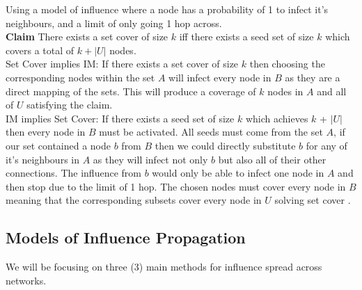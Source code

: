 \documentclass{article}
\begin{document}
Using a model of influence where a node has a probability of 1 to infect it's neighbours, and a limit of only going 1 hop across.
\\

\textbf{Claim} There exists a set cover of size $k$ iff there exists a seed set of size $k$ which covers a total of $k + |U|$ nodes.
\\

Set Cover implies IM: If there exists a set cover of size $k$ then choosing the corresponding nodes within the set $A$ will infect every node in $B$ as they are a direct mapping of the sets. This will produce a coverage of $k$ nodes in $A$ and all of $U$ satisfying the claim.
\\

IM implies Set Cover: If there exists a seed set of size $k$ which achieves $k$ + $|U|$ then every node in $B$ must be activated. All seeds must come from the set $A$, if our set contained a node $b$ from $B$ then we could directly substitute $b$ for any of it's neighbours in $A$ as they will infect not only $b$ but also all of their other connections. The influence from $b$ would only be able to infect one node in $A$ and then stop due to the limit of 1 hop. The chosen nodes must cover every node in $B$ meaning that the corresponding subsets cover every node in $U$ solving set cover \cite{tardoskempe2003}.

\subsection{Models of Influence Propagation}
We will be focusing on three (3) main methods for influence spread across networks.
\end{document}
